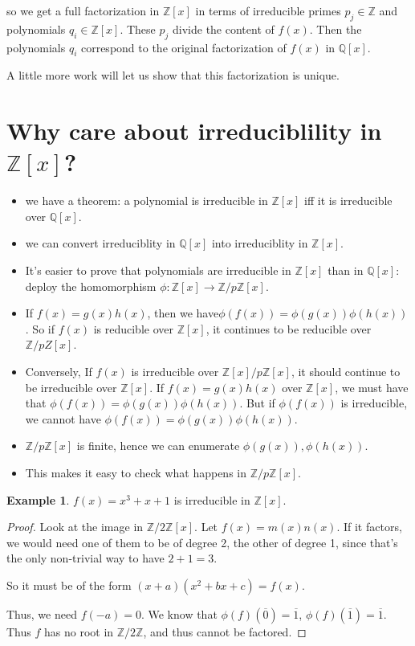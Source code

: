 \documentclass{book}
\newcommand{\Z}{\ensuremath{\mathbb{Z}}}
\newcommand{\Q}{\ensuremath{\mathbb{Q}}}
\theoremstyle{definition}
\newtheorem{example}[theorem]{Example}
\begin{document}
so we get a full factorization in $\Z[x]$ in terms of irreducible primes
$p_j \in \Z$ and polynomials $q_i \in \Z[x]$. These $p_j$ divide the content
of $f(x)$. Then the polynomials $q_i$ correspond to the original factorization
of $f(x)$ in $\Q[x]$.

A little more work will let us show that this factorization is unique.

\section{Why care about irreduciblility in $\Z[x]$?}
\begin{itemize}
\item we have a theorem: a polynomial is irreducible in $\Z[x]$ iff it
is irreducible over $\Q[x]$.

\item we can convert irreduciblity in $\Q[x]$ into irreduciblity in $\Z[x]$.
\item It's easier to prove that polynomials are irreducible in $\Z[x]$ than in $\Q[x]$:
    deploy the homomorphism $\phi: \Z[x] \rightarrow \Z/p\Z[x]$.
\item If $f(x) = g(x)h(x)$, then we have$\phi(f(x)) = \phi(g(x)) \phi(h(x))$.
      So if $f(x)$ is reducible over $\Z[x]$, it continues to be reducible
        over $\Z/pZ[x]$.
\item Conversely, If $f(x)$ is irreducible over $\Z[x]/p\Z[x]$, it should continue to be
    irreducible over $\Z[x]$. If $f(x) = g(x) h(x)$ over $\Z[x]$, we must have
        that $\phi(f(x)) = \phi(g(x))\phi(h(x))$. But if $\phi(f(x))$ is irreducible,
        we cannot have $\phi(f(x)) = \phi(g(x)) \phi(h(x))$.
\item $\Z/p\Z[x]$ is finite, hence we can enumerate $\phi(g(x)), \phi(h(x))$.
\item This makes it easy to check what happens in $\Z/p\Z[x]$.
\end{itemize}

\begin{example}
    $f(x) = x^3 + x + 1$ is irreducible in $\Z[x]$.
\end{example}
\begin{proof}
    Look at the image in $\Z/2\Z[x]$. Let $f(x) = m(x) n(x)$. If it factors,
    we would need one of them to be of degree 2, the other of degree 1,
    since that's the only non-trivial way to have $2 + 1 = 3$.

    So it must be of the form $(x + a)(x^2 + bx + c) = f(x)$.

    Thus, we need $f(-a) = 0$. We know that
    $\phi(f)(\overline 0) = \overline 1$,
    $\phi(f)(\overline 1) = \overline 1$.
    Thus $f$ has no root in $\Z/2\Z$, and thus cannot be factored.
\end{proof}
\end{document}
